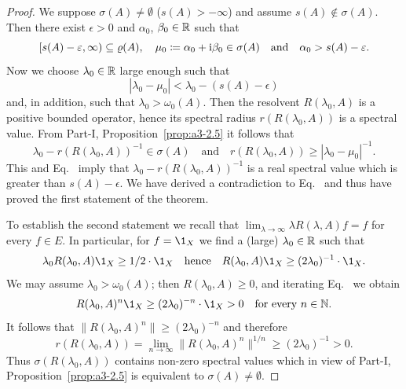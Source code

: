 \begin{proof}
	We suppose $\sigma(A) \neq \emptyset$ (\ie $s(A) > -\infty$) and assume $s(A) \notin \sigma(A)$.
	Then there exist $\epsilon > 0$ and $\alpha_{0}$, $\beta_{0} \in \mathbb{R}$ such that
	\begin{equation}\label{eq:b3-1.1}
		[s(A)-\epsilon,\infty) \subseteq \rho(A), \quad \mu_{0} \coloneq \alpha_{0} + \im\beta_{0} \in \sigma(A) \quad \text{and} \quad \alpha_{0} > s(A)-\epsilon.
	\end{equation}
	Now we choose $\lambda_{0} \in \mathbb{R}$ large enough such that
	\begin{equation}\label{eq:b3-1.2}
		|\lambda_{0} - \mu_{0}| < \lambda_{0} - (s(A) - \epsilon)
	\end{equation}
	and, in addition, such that $\lambda_{0} > \omega_{0}(A)$.
	Then the resolvent $R(\lambda_{0},A)$ is a positive bounded operator, hence its spectral radius $r(R(\lambda_{0},A))$ is a spectral value.
	From Part-I, Proposition~\ref{prop:a3-2.5} it follows that
	\begin{equation}\label{eq:b3-1.3}
		\lambda_{0} - r(R(\lambda_{0},A))^{-1} \in \sigma(A) \quad \text{and} \quad r(R(\lambda_{0},A)) \geq |\lambda_{0} - \mu_{0}|^{-1}.
	\end{equation}
	This and Eq.~ imply that $\lambda_{0} - r(R(\lambda_{0},A))^{-1}$ is a real spectral value which is greater than $s(A) - \epsilon$.
	We have derived a contradiction to Eq.~ and thus have proved the first statement of the theorem.
	
	To establish the second statement we recall that $\lim_{\lambda \to \infty}\lambda R(\lambda,A)f = f$ for every $f \in E$.
	In particular, for $f = \1_{X}$ we find a (large) $\lambda_{0} \in \mathbb{R}$ such that
	\begin{equation}\label{eq:b3-1.4}
		\lambda_{0}R(\lambda_{0},A)\1_{X} \geq 1/2\cdot\1_{X} \quad \text{hence} \quad R(\lambda_{0},A)\1_{X} \geq (2\lambda_{0})^{-1}\cdot\1_{X}.
	\end{equation}
	We may assume $\lambda_{0} > \omega_{0}(A)$; then $R(\lambda_{0},A) \geq 0$, and iterating Eq.~ we obtain
	\begin{equation}\label{eq:b3-1.5}
		R(\lambda_{0},A)^{n}\1_{X} \geq (2\lambda_{0})^{-n}\cdot\1_{X} > 0 \quad \text{for every } n \in \N.
	\end{equation}
	It follows that $\|R(\lambda_{0},A)^{n}\| \geq (2\lambda_{0})^{-n}$ and therefore
	\begin{equation}\label{eq:b3-1.6}
		r(R(\lambda_{0},A)) = \lim_{n \to \infty}\|R(\lambda_{0},A)^{n}\|^{1/n} \geq (2\lambda_{0})^{-1} > 0.
	\end{equation}
	Thus $\sigma(R(\lambda_{0},A))$ contains non-zero spectral values which in view of Part-I, Proposition~\ref{prop:a3-2.5} is equivalent to $\sigma(A) \neq \emptyset$.
\end{proof}
